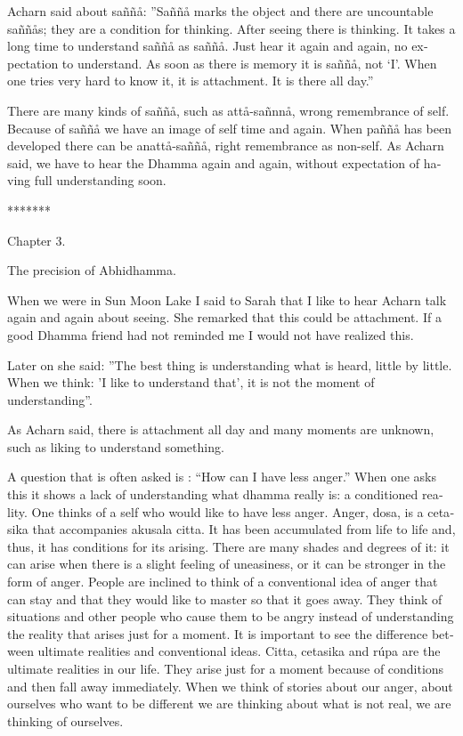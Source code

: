 \textdutch{Acharn said about saññå: ''Saññå marks the object and there
are uncountable saññås; they are a condition for thinking. After seeing
there is thinking. It takes a long time to understand saññå as saññå.
Just hear it again and again, no expectation to understand. As soon as
there is memory it is saññå, not `I'. When one tries very hard to know
it, it is attachment. It is there all day.''}

\textdutch{There are many kinds of saññå, such as attå-sañnnå, wrong
remembrance of self. Because of saññå we have an image of self time and
again. When paññå has been developed there can be anattå-saññå, right
remembrance as non-self. As Acharn said, we have to hear the Dhamma
again and again, without expectation of having full understanding soon.
}

\textdutch{*******}

\textdutch{Chapter 3. }

\textdutch{The precision of Abhidhamma.}

\textdutch{When we were in Sun Moon Lake I said to Sarah that I like to
hear Acharn talk again and again about seeing. She remarked that this
could be attachment. If a good Dhamma friend had not reminded me I would
not have realized this. }

\textdutch{Later on she said: ''The best thing is understanding what is
heard, little by little. When we think: 'I like to understand that', it
is not the moment of understanding''. }

\textdutch{As Acharn said, there is attachment all day and many moments
are unknown, such as liking to understand something. }

\textdutch{A question that is often asked is : ``How can I have less
anger.'' When one asks this it shows a lack of understanding what dhamma
really is: a conditioned reality. One thinks of a self who would like to
have less anger. Anger, dosa, is a cetasika that accompanies akusala
citta. It has been accumulated from life to life and, thus, it has
conditions for its arising. There are many shades and degrees of it: it
can arise when there is a slight feeling of uneasiness, or it can be
stronger in the form of anger. People are inclined to think of a
conventional idea of anger that can stay and that they would like to
master so that it goes away. They think of situations and other people
who cause them to be angry instead of understanding the reality that
arises just for a moment. It is important to see the difference between
ultimate realities and conventional ideas. Citta, cetasika and rúpa are
the ultimate realities in our life. They arise just for a moment because
of conditions and then fall away immediately. When we think of stories
about our anger, about ourselves who want to be different we are
thinking about what is not real, we are thinking of ourselves.}

